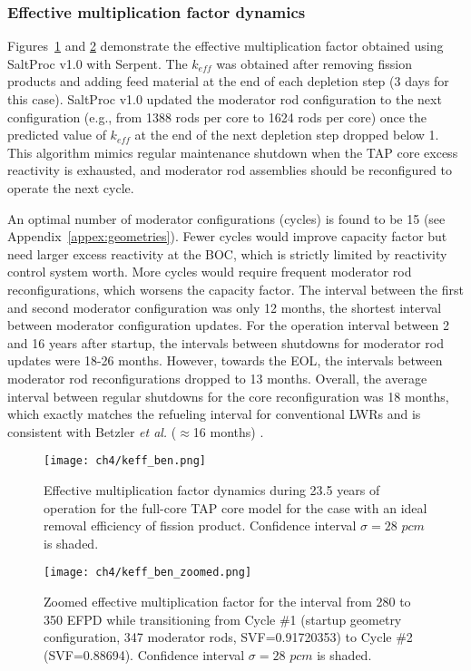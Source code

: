\subsubsection{Effective multiplication factor dynamics}
Figures~\ref{fig:keff-ben-valid} and \ref{fig:keff-ben-valid-zoomed} 
demonstrate the effective multiplication factor obtained using SaltProc v1.0 
with Serpent. The $k_{eff}$ was obtained after removing fission products and 
adding feed material at the end of each depletion step (3 days for this case). 
SaltProc v1.0 updated the moderator rod configuration to the next 
configuration (e.g., from 1388 rods per core to 1624 rods per core) once the
predicted value of $k_{eff}$ at the end of the next depletion step dropped 
below 1. 
This algorithm mimics regular maintenance shutdown when the \gls{TAP} core 
excess reactivity is exhausted, and moderator rod assemblies should be 
reconfigured to operate the next cycle. 

An optimal number of moderator configurations (cycles) is found to be 15 (see 
Appendix~\ref{appex:geometries}). Fewer cycles would improve capacity factor 
but need larger excess reactivity at the \gls{BOC}, which is strictly limited 
by reactivity control system worth. More cycles would require frequent 
moderator rod reconfigurations, which worsens the capacity factor.  The 
interval between the first and second moderator configuration was only 12 
months, the shortest interval between moderator configuration updates. For the 
operation interval between 2 and 16 years after startup, the intervals between 
shutdowns for moderator rod updates were 18-26 months. However, towards the 
\gls{EOL}, the intervals between moderator rod reconfigurations dropped to 13 
months. 
Overall, the average interval between regular shutdowns for the core 
reconfiguration was 18 months, which exactly matches the refueling interval 
for conventional \glspl{LWR} and is consistent with Betzler \emph{et al.} 
($\approx$16 months) \cite{betzler_assessment_2017-1}.
\begin{figure}[htp!] %
	\centering
	\texttt{[image: ch4/keff\_ben.png]}
		\vspace{-9mm}
	\caption{Effective multiplication factor dynamics during 23.5 years of 
	operation for the full-core \gls{TAP} core model for the case with an 
	ideal removal efficiency of fission product. Confidence interval 
	$\sigma=28$ $pcm$ is shaded.}
	\label{fig:keff-ben-valid}
\end{figure}
\begin{figure}[htp!] %
	\centering
	\texttt{[image: ch4/keff\_ben\_zoomed.png]}
		\vspace{-4mm}
	\caption{Zoomed effective multiplication factor for the interval from 280 
		to 350 EFPD while transitioning from Cycle \#1 (startup geometry 
		configuration, 347 moderator rods, \gls{SVF}=0.91720353) to Cycle \#2 
		(\gls{SVF}=0.88694). Confidence interval $\sigma=28$ $pcm$ is 
		shaded.}
	\label{fig:keff-ben-valid-zoomed}
\end{figure}

